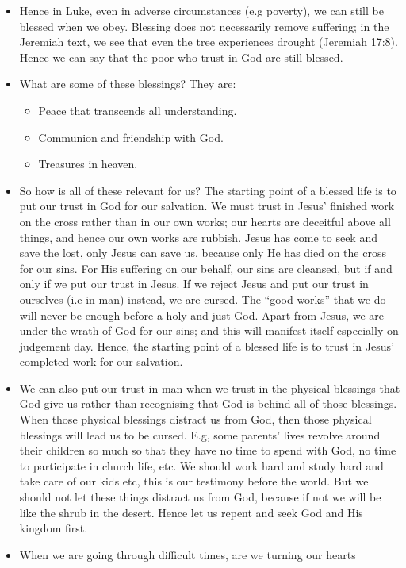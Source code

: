 \begin{itemize}
{  their trust is in the LORD.}
  \item{Hence in Luke, even in adverse circumstances (e.g poverty), we can
  still be blessed when we obey.  Blessing does not necessarily remove
  suffering; in the Jeremiah text, we see that even the tree experiences
  drought (Jeremiah 17:8).  Hence we can say that the poor who trust in God
  are still blessed.}
  \item{What are some of these blessings? They are:
  \begin{itemize}
    \item{Peace that transcends all understanding.}
    \item{Communion and friendship with God.}
    \item{Treasures in heaven.}
  \end{itemize}}
  \item{So how is all of these relevant for us?  The starting point of a
  blessed life is to put our trust in God for our salvation.  We must trust
  in Jesus' finished work on the cross rather than in our own works; our
  hearts are deceitful above all things, and hence our own works are rubbish.
  Jesus has come to seek and save the lost, only Jesus can save us, because
  only He has died on the cross for our sins.  For His suffering on our
  behalf, our sins are cleansed, but if and only if we put our trust in
  Jesus.  If we reject Jesus and put our trust in ourselves (i.e in man)
  instead, we are cursed.  The ``good works'' that we do will never be enough
  before a holy and just God.  Apart from Jesus, we are under the wrath of
  God for our sins; and this will manifest itself especially on judgement
  day.  Hence, the starting point of a blessed life is to trust in Jesus'
  completed work for our salvation.}
  \item{We can also put our trust in man when we trust in the physical
  blessings that God give us rather than recognising that God is behind all
  of those blessings.  When those physical blessings distract us from God,
  then those physical blessings will lead us to be cursed.  E.g, some
  parents' lives revolve around their children so much so that they have no
  time to spend with God, no time to participate in church life, etc.  We
  should work hard and study hard and take care of our kids etc, this is our
  testimony before the world.  But we should not let these things distract us
  from God, because if not we will be like the shrub in the desert.  Hence
  let us repent and seek God and His kingdom first.}
  \item{When we are going through difficult times, are we turning our hearts
}
\end{itemize}
